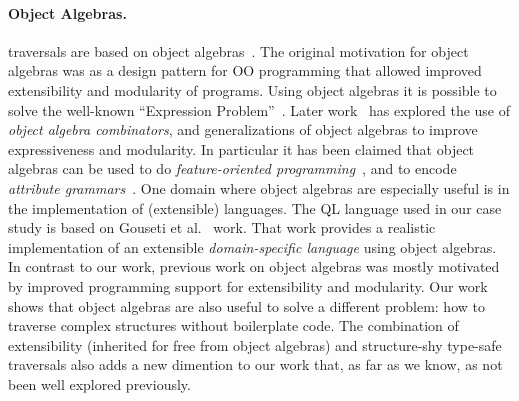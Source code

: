 \paragraph{Object Algebras.} \name traversals are based on
object algebras~\cite{bruno12oa}. The original motivation for object
algebras was as a design pattern for OO programming that allowed
improved extensibility and modularity of programs.  Using object
algebras it is possible to solve the well-known ``Expression
Problem''~\cite{wadler98expression-problem}.  Later
work~\cite{oliveira13fop,rendel14attributes} has explored the use of
\emph{object algebra combinators}, and generalizations of object
algebras to improve expressiveness and modularity. In particular it
has been claimed that object algebras can be used to do
\emph{feature-oriented programming}~\cite{oliveira13fop}, and to
encode \emph{attribute grammars}~\cite{rendel14attributes}. One domain
where object algebras are especially useful is in the implementation
of (extensible) languages.  The QL language used in our case study is
based on Gouseti et al.~\cite{gouseti14extensible} work. That work
provides a realistic implementation of an extensible
\emph{domain-specific language} using object algebras. In contrast to
our work, previous work on object algebras was mostly motivated by
improved programming support for extensibility and modularity. Our
work shows that object algebras are also useful to solve a different
problem: how to traverse complex structures without boilerplate
code. The combination of extensibility (inherited for free from object
algebras) and structure-shy type-safe traversals also adds a new
dimention to our work that, as far as we know, as not been well explored
previously.

